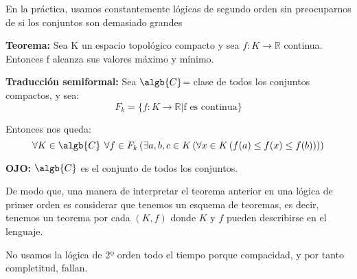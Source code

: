 En la práctica, usamos constantemente lógicas de segundo orden sin preocuparnos de si los conjuntos son demasiado grandes
\begin{example}
\textbf{Teorema:} Sea K un espacio topológico compacto y sea $f: K \rightarrow \mathbb{R}$ continua. Entonces f alcanza sus valores máximo y mínimo.

\textbf{Traducción semiformal:} Sea $\algb{C}$= clase de todos los conjuntos compactos, y sea:
$$F_k = \{f: K \rightarrow \mathbb{R} | \text{f es continua}\}$$

Entonces nos queda:
$$\forall K \in \algb{C} \textbf{ }\forall f \in F_k \left( \exists a,b,c \in K \left( \forall x \in K \left( f(a) \leq f(x) \leq f(b) \right) \right) \right)$$

\textbf{OJO:} $\algb{C}$ es el conjunto de todos los conjuntos.

De modo que, una manera de interpretar el teorema anterior en una lógica de primer orden es considerar que tenemos un esquema de teoremas, es decir, tenemos un teorema por cada $(K,f)$ donde $K$ y $f$ pueden describirse en el lenguaje.
\end{example}


No usamos la lógica de 2º orden todo el tiempo porque compacidad, y por tanto completitud, fallan.

